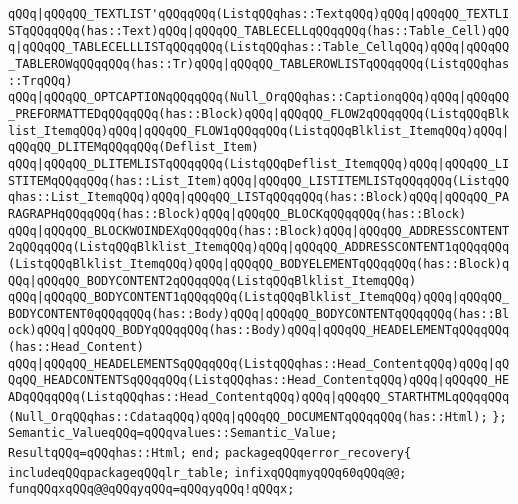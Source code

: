 \verb|qQQq|\verb#|qQQqQQ_TEXTLIST'qQQqqQQq(ListqQQqhas::TextqQQq)qQQq|qQQqQQ_TEXTLISTqQQqqQQq(has::Text)qQQq|qQQqQQ_TABLECELLqQQqqQQq(has::Table_Cell)qQQq|qQQqQQ_TABLECELLLISTqQQqqQQq(ListqQQqhas::Table_CellqQQq)qQQq|qQQqQQ_TABLEROWqQQqqQQq(has::Tr)qQQq|qQQqQQ_TABLEROWLISTqQQqqQQq(ListqQQqhas::TrqQQq)#\newline
\verb|qQQq|\verb#|qQQqQQ_OPTCAPTIONqQQqqQQq(Null_OrqQQqhas::CaptionqQQq)qQQq|qQQqQQ_PREFORMATTEDqQQqqQQq(has::Block)qQQq|qQQqQQ_FLOW2qQQqqQQq(ListqQQqBlklist_ItemqQQq)qQQq|qQQqQQ_FLOW1qQQqqQQq(ListqQQqBlklist_ItemqQQq)qQQq|qQQqQQ_DLITEMqQQqqQQq(Deflist_Item)#\newline
\verb|qQQq|\verb#|qQQqQQ_DLITEMLISTqQQqqQQq(ListqQQqDeflist_ItemqQQq)qQQq|qQQqQQ_LISTITEMqQQqqQQq(has::List_Item)qQQq|qQQqQQ_LISTITEMLISTqQQqqQQq(ListqQQqhas::List_ItemqQQq)qQQq|qQQqQQ_LISTqQQqqQQq(has::Block)qQQq|qQQqQQ_PARAGRAPHqQQqqQQq(has::Block)qQQq|qQQqQQ_BLOCKqQQqqQQq(has::Block)#\newline
\verb|qQQq|\verb#|qQQqQQ_BLOCKWOINDEXqQQqqQQq(has::Block)qQQq|qQQqQQ_ADDRESSCONTENT2qQQqqQQq(ListqQQqBlklist_ItemqQQq)qQQq|qQQqQQ_ADDRESSCONTENT1qQQqqQQq(ListqQQqBlklist_ItemqQQq)qQQq|qQQqQQ_BODYELEMENTqQQqqQQq(has::Block)qQQq|qQQqQQ_BODYCONTENT2qQQqqQQq(ListqQQqBlklist_ItemqQQq)#\newline
\verb|qQQq|\verb#|qQQqQQ_BODYCONTENT1qQQqqQQq(ListqQQqBlklist_ItemqQQq)qQQq|qQQqQQ_BODYCONTENT0qQQqqQQq(has::Body)qQQq|qQQqQQ_BODYCONTENTqQQqqQQq(has::Block)qQQq|qQQqQQ_BODYqQQqqQQq(has::Body)qQQq|qQQqQQ_HEADELEMENTqQQqqQQq(has::Head_Content)#\newline
\verb|qQQq|\verb#|qQQqQQ_HEADELEMENTSqQQqqQQq(ListqQQqhas::Head_ContentqQQq)qQQq|qQQqQQ_HEADCONTENTSqQQqqQQq(ListqQQqhas::Head_ContentqQQq)qQQq|qQQqQQ_HEADqQQqqQQq(ListqQQqhas::Head_ContentqQQq)qQQq|qQQqQQ_STARTHTMLqQQqqQQq(Null_OrqQQqhas::CdataqQQq)qQQq|qQQqQQ_DOCUMENTqQQqqQQq(has::Html);#\newline
\verb|};|\newline
\verb|Semantic_ValueqQQq=qQQqvalues::Semantic_Value;|\newline
\verb|ResultqQQq=qQQqhas::Html;|\newline
\verb|end;|\newline
\verb|packageqQQqerror_recovery{|\newline
\verb|includeqQQqpackageqQQqlr_table;|\newline
\verb|infixqQQqmyqQQq60qQQq@@;|\newline
\verb|funqQQqxqQQq@@qQQqyqQQq=qQQqyqQQq!qQQqx;|\newline
